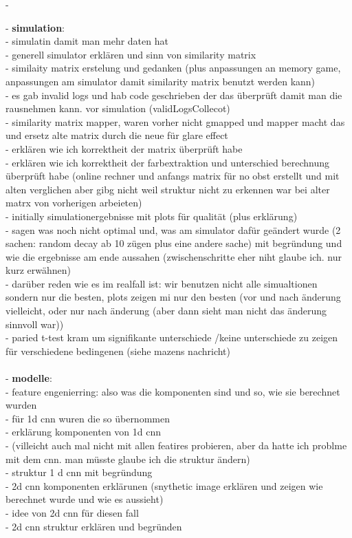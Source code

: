 - 

- \textbf{simulation}:\\
- simulatin damit man mehr daten hat\\
- generell simulator erklären und sinn von similarity matrix\\
- similaity matrix erstelung und gedanken (plus anpassungen an memory game, anpassungen am simulator damit similarity matrix benutzt werden kann)\\
- es gab invalid logs und hab code geschrieben der das überprüft damit man die rausnehmen kann. vor simulation (validLogsCollecot)\\
- similarity matrix mapper, waren vorher nicht gmapped und mapper macht das und ersetz alte matrix durch die neue für glare effect\\
- erklären wie ich korrektheit der matrix überprüft habe\\
- erklären wie ich korrektheit der farbextraktion und unterschied berechnung überprüft habe (online rechner und anfangs matrix für no obst erstellt und mit alten verglichen aber gibg nicht weil struktur nicht zu erkennen war bei alter matrx von vorherigen arbeieten)\\
- initially simulationergebnisse mit plots für qualität (plus erklärung)\\
- sagen was noch nicht optimal und, was am simulator dafür geändert wurde (2 sachen: random decay ab 10 zügen plus eine andere sache) mit begründung und wie die ergebnisse am ende aussahen (zwischenschritte eher niht glaube ich. nur kurz erwähnen)\\
- darüber reden wie es im realfall ist: wir benutzen nicht alle simualtionen sondern nur die besten, plots zeigen mi nur den besten (vor und nach änderung vielleicht, oder nur nach änderung (aber dann sieht man nicht das änderung sinnvoll war))\\
- paried t-test kram um signifikante unterschiede /keine unterschiede zu zeigen für verschiedene bedingenen (siehe mazens nachricht)\\\\

- \textbf{modelle}:\\
- feature engenierring: also was die komponenten sind und so, wie sie berechnet wurden\\
- für 1d cnn wuren die so übernommen\\
- erklärung komponenten von 1d cnn \\
- (villeicht auch mal nicht mit allen featires probieren, aber da hatte ich problme mit dem cnn. man müsste glaube ich die struktur ändern)\\
- struktur 1 d cnn mit begründung\\ 
- 2d cnn komponenten erklärunen (snythetic image erklären und zeigen wie berechnet wurde und wie es aussieht)\\
- idee von 2d cnn für diesen fall\\
- 2d cnn struktur erklären und begründen\\\\

